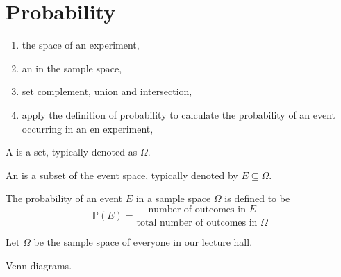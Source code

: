 \documentclass[../main.tex]{subfiles}
\begin{document}
 \section{Probability}

\begin{objective}
  \begin{enumerate}
    \item the  space of an experiment,
    \item an  in the sample space,
    \item set complement, union and intersection,
    \item apply the definition of probability to calculate the probability of an event occurring in an en experiment,
  \end{enumerate}
\end{objective}

\begin{definition}
  A  is a set, typically denoted as \(\Omega\).
\end{definition}

An  is a subset of the event space, typically denoted by \(E \subseteq \Omega\).

The probability of an event \(E\) in a sample space \(\Omega\) is defined to be
\[
  \mathbb{P}(E) = \frac{\text{number of outcomes in \(E\)}}{\text{total number of outcomes in \(\Omega\)}}
\]

\begin{example}
  Let \(\Omega\) be the sample space of everyone in our lecture hall.  
\end{example}

Venn diagrams.
\end{document}
